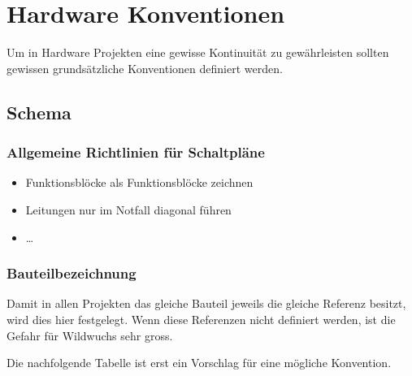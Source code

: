 



\section{Hardware Konventionen}
Um in Hardware Projekten eine gewisse Kontinuität zu gewährleisten sollten 
gewissen grundsätzliche Konventionen definiert werden. 

\subsection{Schema}

\subsubsection{Allgemeine Richtlinien für Schaltpläne}
\begin{itemize}
  \item Funktionsblöcke als Funktionsblöcke zeichnen
  \item Leitungen nur im Notfall diagonal führen
  \item \dots
\end{itemize}

\subsubsection{Bauteilbezeichnung}
Damit in allen Projekten das gleiche Bauteil jeweils die gleiche Referenz 
besitzt, wird dies hier festgelegt. Wenn diese Referenzen nicht definiert 
werden, ist die Gefahr für Wildwuchs sehr gross. 

Die nachfolgende Tabelle ist erst ein Vorschlag für eine mögliche Konvention. 


